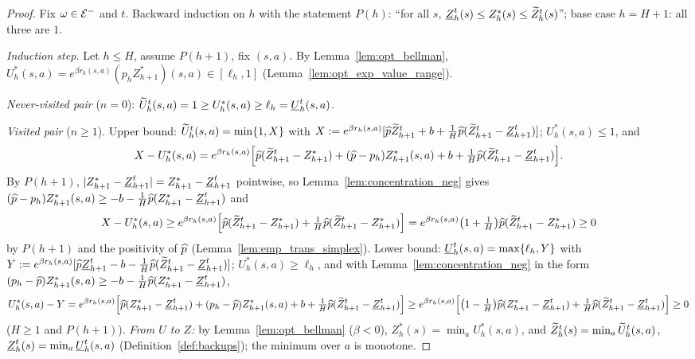 \begin{proof}
\leanok
Fix $\omega \in \mathcal{E}^-$ and $t$. Backward induction on $h$ with the statement $P(h)$: ``for all $s$,
$\underline{Z}_h^t(s) \le Z^*_h(s) \le \widetilde{Z}_h^t(s)$''; base case $h = H+1$: all three are $1$.

\emph{Induction step.} Let $h \le H$, assume $P(h+1)$, fix $(s,a)$. By Lemma~\ref{lem:opt_bellman},
$U^*_h(s,a) = e^{\beta r_h(s,a)}(p_hZ^*_{h+1})(s,a) \in [\ell_h, 1]$ (Lemma~\ref{lem:opt_exp_value_range}).

\emph{Never-visited pair} ($n = 0$): $\widetilde{U}_h^t(s,a) = 1 \ge U^*_h(s,a) \ge \ell_h = \underline{U}_h^t(s,a)$.

\emph{Visited pair} ($n \ge 1$). Upper bound: $\widetilde{U}_h^t(s,a) = \min\{1, X\}$ with
$X := e^{\beta r_h(s,a)}[\widehat{p}\widetilde{Z}^t_{h+1} + b + \frac1H\widehat{p}(\widetilde{Z}^t_{h+1} - \underline{Z}^t_{h+1})]$; $U^*_h(s,a) \le 1$, and
\[
  X - U^*_h(s,a) = e^{\beta r_h(s,a)}\Big[\widehat{p}(\widetilde{Z}^t_{h+1} - Z^*_{h+1}) + (\widehat{p} - p_h)Z^*_{h+1}(s,a) + b
  + \tfrac1H\widehat{p}(\widetilde{Z}^t_{h+1} - \underline{Z}^t_{h+1})\Big] .
\]
By $P(h+1)$, $\lvert Z^*_{h+1} - \underline{Z}^t_{h+1} \rvert = Z^*_{h+1} - \underline{Z}^t_{h+1}$ pointwise, so
Lemma~\ref{lem:concentration_neg} gives $(\widehat{p} - p_h)Z^*_{h+1}(s,a) \ge -b - \frac1H\widehat{p}(Z^*_{h+1} - \underline{Z}^t_{h+1})$
and
\[
  X - U^*_h(s,a) \ge e^{\beta r_h(s,a)}\Big[\widehat{p}(\widetilde{Z}^t_{h+1} - Z^*_{h+1}) + \tfrac1H\widehat{p}(\widetilde{Z}^t_{h+1} - Z^*_{h+1})\Big]
  = e^{\beta r_h(s,a)}\big(1 + \tfrac1H\big)\widehat{p}(\widetilde{Z}^t_{h+1} - Z^*_{h+1}) \ge 0
\]
by $P(h+1)$ and the positivity of $\widehat{p}$ (Lemma~\ref{lem:emp_trans_simplex}). Lower bound:
$\underline{U}_h^t(s,a) = \max\{\ell_h, Y\}$ with $Y := e^{\beta r_h(s,a)}[\widehat{p}\underline{Z}^t_{h+1} - b - \frac1H\widehat{p}(\widetilde{Z}^t_{h+1} - \underline{Z}^t_{h+1})]$;
$U^*_h(s,a) \ge \ell_h$, and with Lemma~\ref{lem:concentration_neg} in the form
$(p_h - \widehat{p})Z^*_{h+1}(s,a) \ge -b - \frac1H\widehat{p}(Z^*_{h+1} - \underline{Z}^t_{h+1})$,
\[
  U^*_h(s,a) - Y = e^{\beta r_h(s,a)}\Big[\widehat{p}(Z^*_{h+1} - \underline{Z}^t_{h+1}) + (p_h - \widehat{p})Z^*_{h+1}(s,a) + b + \tfrac1H\widehat{p}(\widetilde{Z}^t_{h+1} - \underline{Z}^t_{h+1})\Big]
  \ge e^{\beta r_h(s,a)}\Big[\big(1 - \tfrac1H\big)\widehat{p}(Z^*_{h+1} - \underline{Z}^t_{h+1}) + \tfrac1H\widehat{p}(\widetilde{Z}^t_{h+1} - \underline{Z}^t_{h+1})\Big] \ge 0
\]
($H \ge 1$ and $P(h+1)$). \emph{From $U$ to $Z$:} by Lemma~\ref{lem:opt_bellman} ($\beta < 0$),
$Z^*_h(s) = \min_aU^*_h(s,a)$, and $\widetilde{Z}_h^t(s) = \min_a\widetilde{U}_h^t(s,a)$, $\underline{Z}_h^t(s) = \min_a\underline{U}_h^t(s,a)$
(Definition~\ref{def:backups}); the minimum over $a$ is monotone.
\end{proof}

